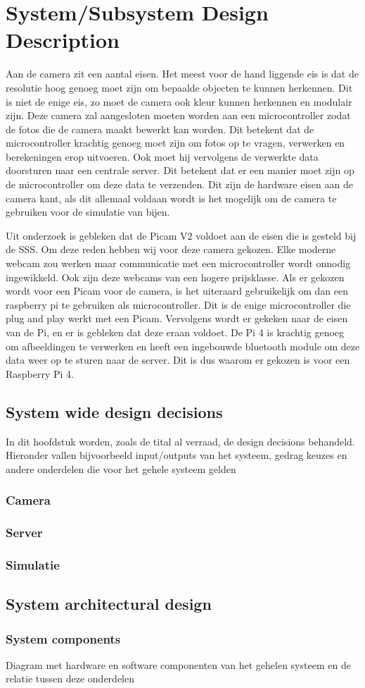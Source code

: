 \section{System/Subsystem Design Description}
Aan de camera zit een aantal eisen. Het meest voor de hand liggende eis is dat de resolutie hoog genoeg moet zijn
om bepaalde objecten te kunnen herkennen. Dit is niet de enige eis, zo moet de camera ook kleur kunnen herkennen 
en modulair zijn. Deze camera zal aangesloten moeten worden aan een microcontroller 
zodat de fotos die de camera maakt bewerkt kan worden. Dit betekent dat de microcontroller krachtig genoeg moet zijn 
om fotos op te vragen, verwerken en berekeningen erop uitvoeren. Ook moet hij vervolgens de verwerkte data doorsturen 
naar een centrale server. Dit betekent dat er een manier moet zijn op de microcontroller om deze data te verzenden.
Dit zijn de hardware eisen aan de camera kant, als dit allemaal voldaan wordt is het mogelijk om de camera te 
gebruiken voor de simulatie van bijen.


Uit onderzoek is gebleken dat de Picam V2 voldoet aan de eisen die is gesteld bij de SSS. 
Om deze reden hebben wij voor deze camera gekozen. Elke moderne webcam zou werken maar communicatie met een 
microcontroller wordt onnodig ingewikkeld. Ook zijn deze webcams van een hogere prijsklasse.
Als er gekozen wordt voor een Picam voor de camera, is het uiteraard gebruikelijk om dan een raspberry pi 
te gebruiken als microcontroller. Dit is de enige microcontroller die plug and play werkt met een Picam. 
Vervolgens wordt er gekeken naar de eisen van de Pi, en er is gebleken dat deze eraan voldoet. 
De Pi 4 is krachtig genoeg om afbeeldingen te verwerken en heeft een ingebouwde bluetooth module 
om deze data weer op te sturen naar de server. Dit is dus waarom er gekozen is voor een Raspberry Pi 4.

\subsection{System wide design decisions}
In dit hoofdstuk worden, zoals de tital al verraad, de design decisions behandeld. Hieronder vallen bijvoorbeeld 
input/outputs van het systeem, gedrag keuzes en andere onderdelen die voor het gehele systeem gelden


\subsubsection*{Camera}

\subsubsection*{Server}

\subsubsection*{Simulatie}




\subsection{System architectural design}


\subsubsection*{System components}
Diagram met hardware en software componenten van het gehelen systeem en de relatie tussen deze onderdelen